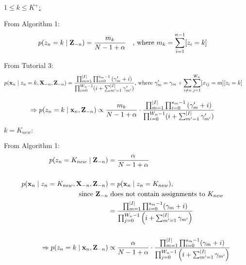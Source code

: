 \begin{enumerate}
    \underline{$1 \leq k \leq K^+$:} 
    
    From Algorithm 1:
    \begin{align*}
        p(z_n = k \mid \mathbf{Z}_{-n}) &= \frac{m_k}{N-1 + \alpha} \quad \text{, where }m_k = \sum_{i=1}^{n-1}[z_i = k]
    \end{align*}
    
    From Tutorial 3:
    \begin{align*}
        p(\bold{x}_n \mid z_n = k, \mathbf{X}_{-n}, \mathbf{Z}_{-n}) &= \frac{\prod_{m=1}^{\vert I \vert}\prod_{i=0}^{s_m-1}\left(\gamma'_m + i\right)}{\prod_{i=0}^{W_n-1}(i+\sum_{m'=1}^{\vert I \vert} \gamma'_{m'})} \text{, where } \gamma'_{m} = \gamma_m + \sum_{i\neq n}\sum_{j=1}^{W_n}[x_{ij} = m][z_i = k]
    \end{align*}
    
    \begin{align*}
       \Rightarrow p(z_n = k \mid \bold{x}_n, \mathbf{Z}_{-n}) &\propto \frac{m_k}{N-1 + \alpha} \cdot \frac{\prod_{m=1}^{\vert I \vert}\prod_{i=0}^{s_m-1}\left(\gamma'_m + i\right)}{\prod_{i=0}^{W_n-1}(i+\sum_{m'=1}^{\vert I \vert} \gamma'_{m'})} 
    \end{align*}
    
    \underline{$k = K_{new}:$}
    
    From Algorithm 1:
    \begin{align*}
        p(z_n = K_{new} \mid \mathbf{Z}_{-n}) &= \frac{\alpha}{N - 1 + \alpha} 
        \\\\
        p(\bold{x}_n \mid z_n = K_{new}, \mathbf{X}_{-n}, \mathbf{Z}_{-n}) &= p(\bold{x}_n \mid z_n = K_{new}),
        \\
        \text{ since } \mathbf{Z}_{-n} &\text{ does not contain assignments to } K_{new}
        \\
        &= \frac{\prod_{m=1}^{\vert I \vert}\prod_{i=0}^{s_m - 1}(\gamma_m + i)}{\prod_{j=0}^{W_n -1}\left( i + \sum_{m'=1}^{\vert I\vert} \gamma_{m'} \right)}
        \\\\
        \Rightarrow p(z_n = k \mid \bold{x}_n, \mathbf{Z}_{-n}) &\propto \frac{\alpha}{N - 1 + \alpha} \cdot \frac{\prod_{m=1}^{\vert I \vert}\prod_{i=0}^{s_m - 1}(\gamma_m + i)}{\prod_{j=0}^{W_n -1}\left( i + \sum_{m'=1}^{\vert I\vert} \gamma_{m'} \right)}
    \end{align*}
    
%    
  
   
 \end{enumerate}


